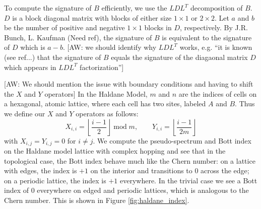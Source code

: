 \documentclass[a4paper]{article}
\newcommand{\aw}[1]{{\color{blue} [AW: #1]}}
\begin{document}
To compute the signature of $B$ efficiently, we use the $LDL^T$ decomposition of $B$.
$D$ is a block diagonal matrix with blocks of either size $1 \times 1$ or $2 \times 2$.
Let $a$ and $b$ be the number of positive and negative $1 \times 1$ blocks in $D$, respectively.
By J.R. Bunch, L. Kaufman (Need ref), the signature of $B$ is equivalent to the signature of $D$ which is $a - b$. \aw{we should identify why $L D L^T$ works, e.g. ``it is known (see ref...) that the signature of $B$ equals the signature of the diagaonal matrix $D$ which appears in $L D L^T$ factorization''}

\aw{We should mention the issue with boundary conditions and having to shift the $X$ and $Y$ operators}
In the Haldane Model, $m$ and $n$ are the indices of cells on a hexagonal, atomic lattice, where each cell has two sites, labeled $A$ and $B$.
Thus we define our $X$ and $Y$ operators as follows:
$$X_{i,i} = \left\lfloor \frac{i-1}{2} \right\rfloor \;\text{mod}\;m, \quad\quad Y_{i,i} = \left\lfloor \frac{i-1}{2m} \right\rfloor$$
with $X_{i,j} = Y_{i,j} = 0$ for $i \neq j$. 
We compute the pseudo-spectrum and Bott index on the Haldane model lattice with complex hopping and see that in the topological case, the Bott index behave much like the Chern number:
on a lattice with edges, the index is $+1$ on the interior and transitions to 0 across the edge;
on a periodic lattice, the index is $+1$ everywhere.
In the trivial case we see a Bott index of 0 everywhere on edged and periodic lattices, which is analogous to the Chern number.
This is shown in Figure \ref{fig:haldane_index}.
\end{document}
